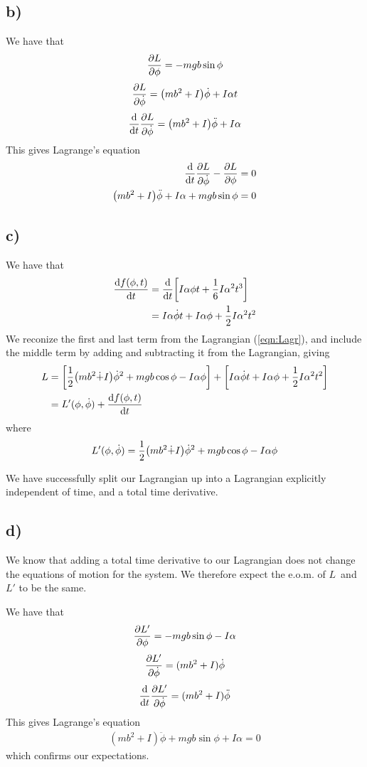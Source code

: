 \documentclass[12p,a4paper]{article}
\newcommand{\half}{\frac{1}{2}}
\begin{document}
\subsection*{b)}
We have that
\[
    \pdv{L}{\phi} = -mgb\sin{\phi}
\]
\[
    \pdv{L}{\dot{\phi}} = \qty(mb^2 + I)\dot{\phi} + I \alpha t
\]
\[
    \dv{t}\pdv{L}{\dot{\phi}} = \qty(mb^2 + I)\ddot{\phi} + I\alpha
\]
This gives Lagrange's equation
\begin{align*}
    \dv{t}\pdv{L}{\dot{\phi}} - \pdv{L}{\phi} = 0 \\
    \qty(mb^2 + I)\ddot{\phi} + I\alpha + mgb\sin{\phi} = 0
\end{align*}


\subsection*{c)}
We have that
\begin{align*}
    \dv{f(\phi, t)}{t} &= \dv{t}\qty[I\alpha\phi t + \frac{1}{6} I \alpha^2t^3] \\
    &= I\alpha\dot{\phi}t + I\alpha\phi + \half I \alpha^2t^2
\end{align*}
We reconize the first and last term from the Lagrangian (\ref{eqn:Lagr}), and include the middle term by adding and subtracting it from the Lagrangian, giving
\begin{align*}
    L &= \qty[ \half \qty(m b^2\dot + I)\dot{\phi}^2 + mgb\cos{\phi} - I\alpha\phi ] + \qty[ I\alpha\dot{\phi}t + I\alpha\phi + \half I \alpha^2t^2 ] \\
    &= L'(\phi, \dot{\phi}) + \dv{f(\phi, t)}{t}
\end{align*}
where
\begin{align*}
    L'(\phi, \dot{\phi}) = \half \qty(m b^2\dot + I)\dot{\phi}^2 + mgb\cos{\phi} - I\alpha\phi
\end{align*}

We have successfully split our Lagrangian up into a Lagrangian explicitly independent of time, and a total time derivative.



\subsection*{d)}
We know that adding a total time derivative to our Lagrangian does not change the equations of motion for the system. We therefore expect the e.o.m. of $L$ and $L'$ to be the same.

We have that
\begin{align*}
    \pdv{L'}{\phi} = -mgb\sin{\phi} - I\alpha
\end{align*}
\begin{align*}
    \pdv{L'}{\dot{\phi}} = (mb^2 + I)\dot{\phi}
\end{align*}
\begin{align*}
    \dv{t}\pdv{L'}{\dot{\phi}} = (mb^2 + I)\ddot{\phi}
\end{align*}
This gives Lagrange's equation
\begin{align*}
    (mb^2 + I)\ddot{\phi} + mgb\sin{\phi} + I\alpha = 0
\end{align*}
which confirms our expectations.
\end{document}
